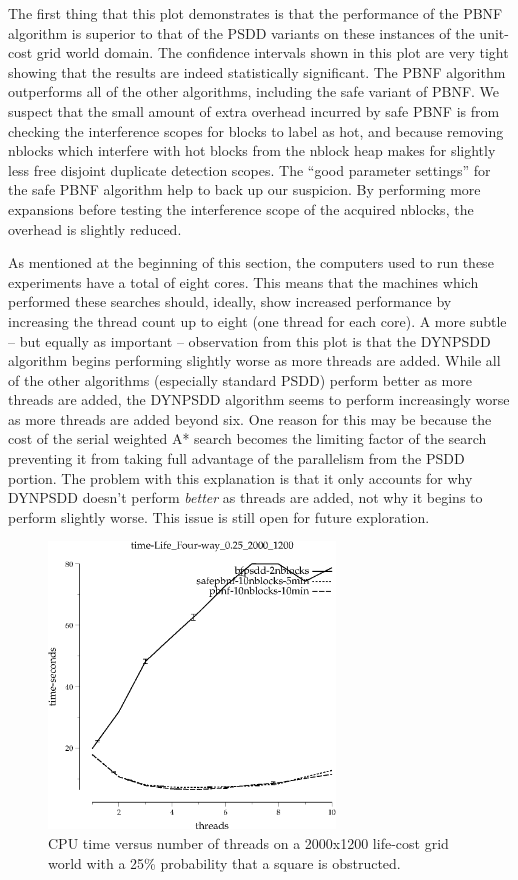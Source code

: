 \documentclass{article}
\begin{document}
The first thing that this plot demonstrates is that the performance of
the PBNF algorithm is superior to that of the PSDD variants on these
instances of the unit-cost grid world domain.  The confidence
intervals shown in this plot are very tight showing that the results
are indeed statistically significant.  The PBNF algorithm outperforms
all of the other algorithms, including the safe variant of PBNF.  We
suspect that the small amount of extra overhead incurred by safe PBNF
is from checking the interference scopes for blocks to label as hot,
and because removing nblocks which interfere with hot blocks from the
nblock heap makes for slightly less free disjoint duplicate detection
scopes.  The ``good parameter settings'' for the safe PBNF algorithm
help to back up our suspicion.  By performing more expansions before
testing the interference scope of the acquired nblocks, the overhead
is slightly reduced.

As mentioned at the beginning of this section, the computers used to
run these experiments have a total of eight cores.  This means that
the machines which performed these searches should, ideally, show
increased performance by increasing the thread count up to eight (one
thread for each core).  A more subtle -- but equally as important --
observation from this plot is that the DYNPSDD algorithm begins
performing slightly worse as more threads are added.  While all of the
other algorithms (especially standard PSDD) perform better as more
threads are added, the DYNPSDD algorithm seems to perform increasingly
worse as more threads are added beyond six.  One reason for this may
be because the cost of the serial weighted A* search becomes the
limiting factor of the search preventing it from taking full advantage
of the parallelism from the PSDD portion.  The problem with this
explanation is that it only accounts for why DYNPSDD doesn't perform
\emph{better} as threads are added, not why it begins to perform
slightly worse.  This issue is still open for future exploration.

\begin{figure}[t]
\includegraphics[width=3in]{../graphs/grid_life_four-way_0.25_2000_1200/time-Life_Four-way_0.25_2000_1200.eps}
\caption{CPU time versus number of threads on a 2000x1200 life-cost
  grid world with a 25\% probability that a square is obstructed.}
\label{fig:grid-life}
\end{figure}
\end{document}
